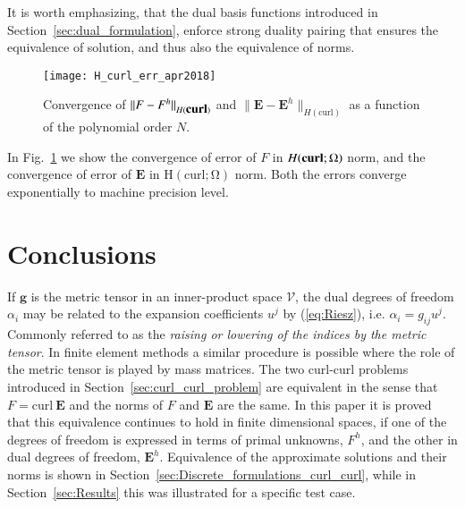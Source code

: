 \documentclass[graybox]{svmult}
\begin{document}
It is worth emphasizing, that the dual basis functions introduced in Section~\ref{sec:dual_formulation}, enforce strong duality pairing that ensures the equivalence of solution, and thus also the equivalence of norms.
\begin{figure}
	\centering
{\texttt{[image: H\_curl\_err\_apr2018]}}
\caption{Convergence of $\|F-F^h\|_{H(\mbox{\bf{curl}})}$ and $\|\bm{E}-\bm{E}^h\|_{H(\mbox{curl})}$ as a function of the polynomial order $N$. }
\label{fig:error_convergence_c_00}
\end{figure}

In Fig.~\ref{fig:error_convergence_c_00} we show the convergence of error of $F$ in $H(\mbox{\textbf{curl}};\Omega)$ norm, and the convergence of error of $\bm{E}$ in $\mathrm{H(curl;\Omega)}$ norm.
Both the errors converge exponentially to machine precision level.

\section{Conclusions}
If $\bm{g}$ is the metric tensor in an inner-product space $\mathcal{V}$, the dual degrees of freedom $\alpha_i$ may be related to the expansion coefficients $u^j$ by (\ref{eq:Riesz}), i.e. $\alpha_i = g_{ij} u^j$. Commonly referred to as the {\em raising or lowering of the indices by the metric tensor}. In finite element methods a similar procedure is possible where the role of the metric tensor is played by mass matrices. The two curl-curl problems introduced in Section~\ref{sec:curl_curl_problem} are equivalent in the sense that $F = \mbox{curl}\ \bm{E}$ and the norms of $F$ and $\bm{E}$ are the same. In this paper it is proved that this equivalence continues to hold in finite dimensional spaces, if one of the degrees of freedom is expressed in terms of primal unknowns, $F^h$, and the other in dual degrees of freedom, $\bm{E}^h$. Equivalence of the approximate solutions and their norms is shown in Section~\ref{sec:Discrete_formulations_curl_curl}, while in Section~\ref{sec:Results} this was illustrated for a specific test case.




\end{document}
